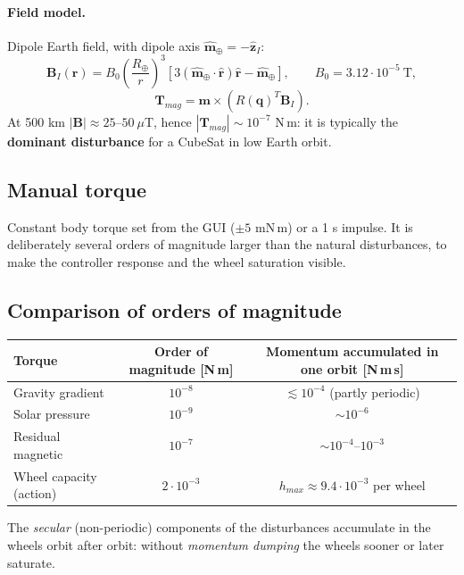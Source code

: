 \documentclass[11pt,a4paper]{article}
\newcommand{\vect}[1]{\bm{#1}}
\newcommand{\q}{\vect{q}}
\newcommand{\T}{\vect{T}}
\begin{document}
\paragraph{Field model.} Dipole Earth field, with dipole axis
$\hat{\vect m}_\oplus = -\hat{\vect z}_I$:
\begin{equation}
  \vect B_I(\vect r) = B_0\left(\frac{R_\oplus}{r}\right)^3
  \left[3(\hat{\vect m}_\oplus\cdot\hat{\vect r})\hat{\vect r} - \hat{\vect m}_\oplus\right],
  \qquad B_0 = 3.12\cdot10^{-5}\ \text{T},
\end{equation}
\begin{equation}
  \T_{mag} = \vect m\times\left(R(\q)^T\vect B_I\right).
\end{equation}
At 500 km $|\vect B|\approx 25$--$50\ \mu$T, hence
$|\T_{mag}|\sim 10^{-7}$ N\,m: it is typically the \textbf{dominant disturbance}
for a CubeSat in low Earth orbit.

\subsection{Manual torque}
Constant body torque set from the GUI ($\pm5$ mN\,m) or a 1 s impulse.
It is deliberately several orders of magnitude larger than the natural
disturbances, to make the controller response and the wheel saturation visible.

\subsection{Comparison of orders of magnitude}
\begin{center}
\begin{tabular}{lcc}
\toprule
Torque & Order of magnitude [N\,m] & Momentum accumulated in one orbit [N\,m\,s]\\
\midrule
Gravity gradient & $10^{-8}$ & $\lesssim 10^{-4}$ (partly periodic)\\
Solar pressure & $10^{-9}$ & $\sim 10^{-6}$\\
Residual magnetic & $10^{-7}$ & $\sim 10^{-4}$--$10^{-3}$\\
Wheel capacity (action) & $2\cdot10^{-3}$ & $h_{max}\approx 9.4\cdot10^{-3}$ per wheel\\
\bottomrule
\end{tabular}
\end{center}
The \emph{secular} (non-periodic) components of the disturbances accumulate in
the wheels orbit after orbit: without \emph{momentum dumping} the wheels
sooner or later saturate.
\end{document}
